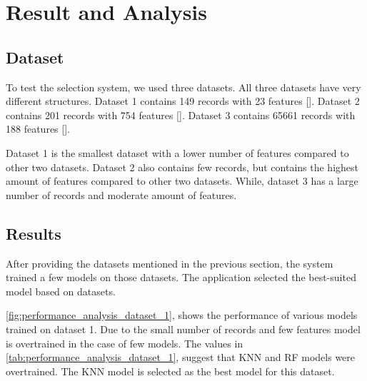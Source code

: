 \section{Result and Analysis}\label{sec:result_and_analysis}

\subsection{Dataset}\label{subsec:dataset}



To test the selection system, we used three datasets. All three datasets have very different structures. Dataset 1 contains 149 records with 23 features []. Dataset 2 contains 201 records with 754 features []. Dataset 3 contains 65661 records with 188 features [].

Dataset 1 is the smallest dataset with a lower number of features compared to other two datasets. Dataset 2 also contains few records, but contains the highest amount of features compared to other two datasets. While, dataset 3 has a large number of records and moderate amount of features.

\subsection{Results}\label{subsec:results}

After providing the datasets mentioned in the previous section, the system trained a few models on those datasets. The application selected the best-suited model based on datasets. 

\autoref{fig:performance_analysis_dataset_1}, shows the performance of various models trained on dataset 1. Due to the small number of records and few features model is overtrained in the case of few models. The values in \autoref{tab:performance_analysis_dataset_1}, suggest that KNN and RF models were overtrained. The KNN model is selected as the best model for this dataset.

